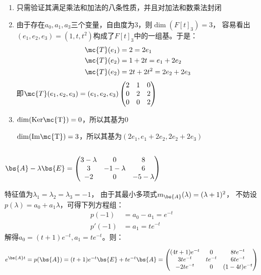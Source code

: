 \subsection{}
\begin{enumerate}
\item 只需验证其满足乘法和加法的八条性质，并且对加法和数乘法封闭
\item 由于存在$a_0,a_1,a_3$三个变量，自由度为3，则$\dim{(F[t]_3)}=3$，
容易看出$(e_1,e_2,e_3)=(1,t,t^2)$构成了$F[t]_3$中的一组基。于是：
\begin{align*}
\mc{T}(e_1)&=2=2e_1 \\
\mc{T}(e_2)&=1+2t=e_1+2e_2 \\
\mc{T}(e_2)&=2t+2t^2=2e_2+2e_3
\end{align*}
即$\mc{T}(e_1,e_2,e_3)=(e_1,e_2,e_3)
\begin{pmatrix}
2 & 1 & 0 \\
0 & 2 & 2 \\
0 & 0 & 2      
\end{pmatrix}$

\item $\dim(\rm{Ker}\mc{T})=0$，所以其基为0

$\dim(\rm{Im}\mc{T})=3$，所以其基为$(2e_1,e_1+2e_2,2e_2+2e_3)$

\end{enumerate}

\subsection{}
$\bs{A}-\lambda\bs{E}=\begin{pmatrix}
3-\lambda& 0& 8 \\
3& -1-\lambda& 6 \\
-2& 0 &-5-\lambda
\end{pmatrix}$

特征值为$\lambda_1=\lambda_2=\lambda_3=-1$，
由于其最小多项式$m_{\bs{A}}(\lambda)=(\lambda+1)^2$，
不妨设$p(\lambda)=a_0+a_1\lambda$，可得下列方程组：
\begin{align*}
p(-1)&=a_0-a_1=e^{-t} \\
p'(-1)&=a_1=te^{-t}
\end{align*}
解得$a_0=(t+1)e^{-t},a_1=te^{-t}$。则：

$e^{\bs{A}t}=p(\bs{A})=
(t+1)e^{-t}\bs{E}+te^{-t}\bs{A}=\begin{pmatrix}
    (4t+1)e^{-t} & 0 & 8te^{-t} \\
    3te^{-t} & te^{-t} & 6te^{-t} \\
    -2te^{-t}& 0 &(1-4t)e^{-t}
\end{pmatrix}    $

